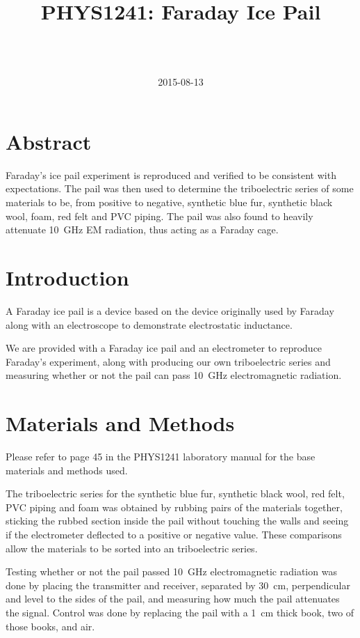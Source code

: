 \documentclass[a4paper]{scrartcl}
\begin{document}
\title{PHYS1241: Faraday Ice Pail}
\author{ \\ \\ }
\date{2015-08-13}
\maketitle

\section{Abstract}
Faraday's ice pail experiment is reproduced and verified to be consistent with expectations. The pail was then used to determine the triboelectric series of some materials to be, from positive to negative, synthetic blue fur, synthetic black wool, foam, red felt and PVC piping. The pail was also found to heavily attenuate \SI{10}{\giga\hertz} EM radiation, thus acting as a Faraday cage.

\section{Introduction}
A Faraday ice pail is a device based on the device originally used by Faraday along with an electroscope to demonstrate electrostatic inductance.

We are provided with a Faraday ice pail and an electrometer to reproduce Faraday's experiment, along with producing our own triboelectric series and measuring whether or not the pail can pass \SI{10}{\giga\hertz} electromagnetic radiation.

\section{Materials and Methods}
Please refer to page 45 in the PHYS1241 laboratory manual for the base materials and methods used.

The triboelectric series for the synthetic blue fur, synthetic black wool, red felt, PVC piping and foam was obtained by rubbing pairs of the materials together, sticking the rubbed section inside the pail without touching the walls and seeing if the electrometer deflected to a positive or negative value. These comparisons allow the materials to be sorted into an triboelectric series.

Testing whether or not the pail passed \SI{10}{\giga\hertz} electromagnetic radiation was done by placing the transmitter and receiver, separated by \SI{30}{\centi\metre}, perpendicular and level to the sides of the pail, and measuring how much the pail attenuates the signal. Control was done by replacing the pail with a \SI{1}{\centi\metre} thick book, two of those books, and air.
\end{document}
